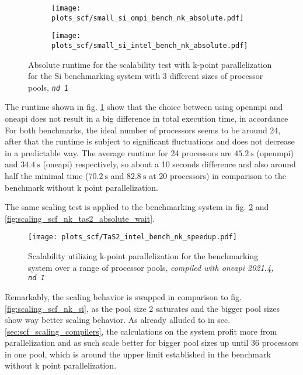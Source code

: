 \documentclass[main.tex]{subfiles}
\begin{document}
\begin{figure}[ht!]
\begin{subfigure}[b]{0.49\textwidth}
    \centering
    \texttt{[image: plots\_scf/small\_si\_ompi\_bench\_nk\_absolute.pdf]}
\end{subfigure}
\begin{subfigure}[b]{0.49\textwidth}
    \centering
    \texttt{[image: plots\_scf/small\_si\_intel\_bench\_nk\_absolute.pdf]}
\end{subfigure}
\caption{Absolute runtime for the scalability test with k-point parallelization for the Si benchmarking system with 3 different sizes of processor pools, \emph{\texttt{nd 1}}}
\label{fig:scaling_scf_nk_si_absolute}
\end{figure}
The runtime shown in fig. \ref{fig:scaling_scf_nk_si_absolute} show that the choice between using \gls{openmpi} and \gls{oneapi} does not result in a big difference in total execution time, in accordance 
For both benchmarks, the ideal number of processors seems to be around 24, after that the runtime is subject to significant fluctuations and does not decrease in a predictable way.
The average runtime for 24 processors are \(\SI{45.2}{\second}\) (\gls{openmpi}) and \(\SI{34.4}{\second}\) (\gls{oneapi}) respectively, so about a 10 seconds difference and also around half the minimal time (\(\SI{70.2}{\second}\) and \(\SI{82.8}{\second}\) at 20 processors) in comparison to the benchmark without k point parallelization.

The same scaling test is applied to the \TaS benchmarking system in fig. \ref{fig:scaling_scf_nk_tas2} and \ref{fig:scaling_scf_nk_tas2_absolute_wait}.

\begin{figure}[ht!]
    \centering
    \texttt{[image: plots\_scf/TaS2\_intel\_bench\_nk\_speedup.pdf]}
    \caption{Scalability utilizing k-point parallelization for the \TaS benchmarking system over a range of processor pools, \emph{\QE compiled with \gls{oneapi} 2021.4, \texttt{nd 1}}}
    \label{fig:scaling_scf_nk_tas2}
\end{figure}
Remarkably, the scaling behavior is swapped in comparison to fig. \ref{fig:scaling_scf_nk_si}, as the pool size 2 saturates and the bigger pool sizes show way better scaling behavior.
As already alluded to in sec. \ref{sec:scf_scaling_compilers}, the calculations on the \TaS system profit more from parallelization and as such scale better for bigger pool sizes up until 36 processors in one pool, which is around the upper limit established in the benchmark without k point parallelization.
\end{document}
